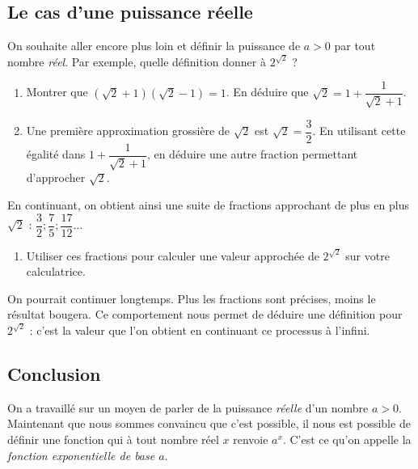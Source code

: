 \documentclass{article}
\begin{document}
\subsection{Le cas d'une puissance réelle}
On souhaite aller encore plus loin et définir la puissance de $a>0$ par tout nombre \emph{réel}. Par exemple, quelle définition donner à $2^{\sqrt{2}}$ ?
\begin{enumerate}[resume*]
\item Montrer que $(\sqrt{2} + 1)(\sqrt{2} - 1) = 1$. En déduire que $\sqrt{2} = 1 + \dfrac{1}{\sqrt{2} + 1}$.
\item Une première approximation grossière de $\sqrt{2}$ est $\sqrt{2}=\dfrac{3}{2}$. En utilisant cette égalité dans $1 + \dfrac{1}{\sqrt{2}+1}$, en déduire une autre fraction permettant d'approcher $\sqrt{2}$.
\end{enumerate}
En continuant, on obtient ainsi une suite de fractions approchant de plus en plus $\sqrt{2}$ : $\dfrac{3}{2}; \dfrac{7}{5}; \dfrac{17}{12}\dots$
\begin{enumerate}[resume*]
\item Utiliser ces fractions pour calculer une valeur approchée de $2^{\sqrt{2}}$ sur votre calculatrice.
\end{enumerate}
On pourrait continuer longtemps. Plus les fractions sont précises, moins le résultat bougera. Ce comportement nous permet de déduire une définition pour $2^{\sqrt{2}}$ : c'est la valeur que l'on obtient en continuant ce processus à l'infini.
\subsection{Conclusion}
On a travaillé sur un moyen de parler de la puissance \emph{réelle} d'un nombre $a>0$. Maintenant que nous sommes convaincu que c'est possible, il nous est possible de définir une fonction qui à tout nombre réel $x$ renvoie $a^x$. C'est ce qu'on appelle la \emph{fonction exponentielle de base $a$}. 
\end{document}
